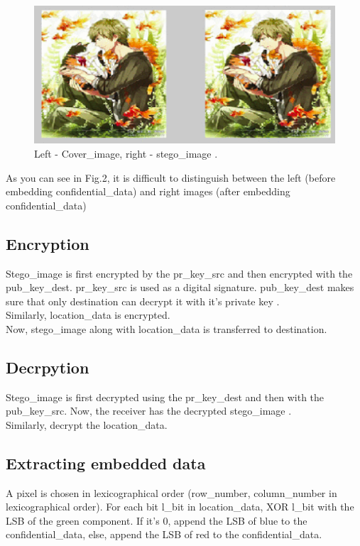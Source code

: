 \documentclass[conference]{IEEEtran}
\begin{document}
\begin{figure}[H]
  \includegraphics[width=\linewidth]{cover_image_vs_stego_image.png}
  \caption{Left - Cover\_image, right - stego\_image \cite{b2}.}
\end{figure}

As you can see in Fig.2, it is difficult to distinguish between the left (before embedding confidential\_data) and right images (after embedding confidential\_data)

\subsection{Encryption}
Stego\_image is first encrypted by the pr\_key\_src and then encrypted with the pub\_key\_dest.
pr\_key\_src is used as a digital signature.
pub\_key\_dest makes sure that only destination can decrypt it with it's private key \cite{b2}.\\

Similarly, location\_data is encrypted.\\

Now, stego\_image along with location\_data is transferred to destination.

\subsection{Decrpytion}
Stego\_image is first decrypted using the pr\_key\_dest and then with the pub\_key\_src.
Now, the receiver has the decrypted stego\_image .\\

Similarly, decrypt the location\_data. \\
\subsection{Extracting embedded data}
A pixel is chosen in lexicographical order (row\_number, column\_number in lexicographical order).
For each bit l\_bit in location\_data, XOR l\_bit with the LSB of the green component.
If it's 0, append the LSB of blue to the confidential\_data, else, append the LSB of red to the confidential\_data.\\
\end{document}
